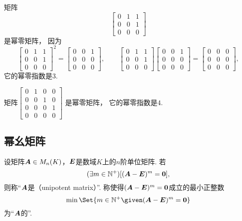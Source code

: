 \begin{example}
矩阵\[
	\begin{bmatrix}
		0 & 1 & 1 \\
		0 & 0 & 1 \\
		0 & 0 & 0
	\end{bmatrix}
\]是幂零矩阵，
因为\[
	\begin{bmatrix}
		0 & 1 & 1 \\
		0 & 0 & 1 \\
		0 & 0 & 0
	\end{bmatrix}^2
	=
	\begin{bmatrix}
		0 & 0 & 1 \\
		0 & 0 & 0 \\
		0 & 0 & 0
	\end{bmatrix},
	\qquad
	\begin{bmatrix}
		0 & 1 & 1 \\
		0 & 0 & 1 \\
		0 & 0 & 0
	\end{bmatrix}
	\begin{bmatrix}
		0 & 0 & 1 \\
		0 & 0 & 0 \\
		0 & 0 & 0
	\end{bmatrix}
	=
	\begin{bmatrix}
		0 & 0 & 0 \\
		0 & 0 & 0 \\
		0 & 0 & 0
	\end{bmatrix},
\]
它的幂零指数是\(3\).
\end{example}
\begin{example}
矩阵\begin{math}
	\begin{bmatrix}
		0 & 1 & 0 & 0 \\
		0 & 0 & 1 & 0 \\
		0 & 0 & 0 & 1 \\
		0 & 0 & 0 & 0
	\end{bmatrix}
\end{math}
是幂零矩阵，
它的幂零指数是\(4\).
\end{example}

\subsection{幂幺矩阵}
\begin{definition}
设矩阵\(\boldsymbol{A} \in M_n(K)\)，\(\boldsymbol{E}\)是数域\(K\)上的\(n\)阶单位矩阵.
若\[
	(\exists m\in\mathbb{N}^+)
	[(\boldsymbol{A}-\boldsymbol{E})^m=\boldsymbol0],
\]
则称“\(\boldsymbol{A}\)是（unipotent matrix）”.
称使得\((\boldsymbol{A}-\boldsymbol{E})^m=\boldsymbol0\)成立的最小正整数\[
    \min\Set{ m\in\mathbb{N}^+ \given (\vb{A}-\vb{E})^m=\vb0 }
\]为“\(\boldsymbol{A}\)的”.
\end{definition}

